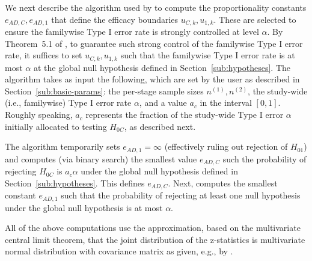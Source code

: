 \documentclass[article]{jss}
\begin{document}
We next describe the algorithm used by   to compute the proportionality constants $e_{AD,C}, e_{AD,1}$ that define the efficacy boundaries $u_{C,k},u_{1,k}$. These are selected to ensure the familywise Type I error rate is strongly controlled at level $\alpha$. By Theorem~5.1 of  \citep{Rosenblum2013AdaptMISTIE}, to guarantee such strong control of the familywise Type I error rate, it suffices to set $u_{C,k},u_{1,k}$ such that the familywise Type I error rate is at most $\alpha$ at the global null hypothesis defined in Section~\ref{sub:hypotheses}.
The algorithm takes as input the following, which are set by the user as described in Section~\ref{sub:basic-params}: the per-stage sample sizes $n^{(1)},n^{(2)}$, the study-wide (i.e., familywise) Type I error rate $\alpha$, and a value $a_c$ in the interval $[0,1]$. 
Roughly speaking, $a_c$ represents the fraction of the study-wide Type I error $\alpha$ initially allocated to testing $H_{0C}$, as described next.

The algorithm temporarily sets $e_{AD,1}= \infty$ (effectively ruling out rejection of $H_{01}$)
and computes (via binary search) the smallest value $e_{AD,C}$ such the probability of rejecting $H_{0C}$ is $a_c α$ under the global null hypothesis defined in Section~\ref{sub:hypotheses}. This defines $e_{AD,C}$. 
Next,   computes the smallest constant $e_{AD,1}$ such that the probability of rejecting at least one null hypothesis under the global null hypothesis  is at most $\alpha$. %

All of the above computations use the approximation, based on the multivariate central limit theorem, that the joint distribution of the  z-statistics is multivariate normal distribution with covariance matrix as given, e.g., by \cite{JennisonTurnbullBook,Rosenblum2013AdaptMISTIE}.

\end{document}

